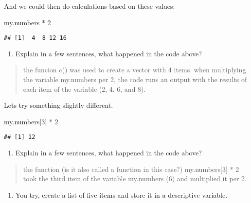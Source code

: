 \documentclass[
]{article}
\newenvironment{Shaded}{\begin{snugshade}}{\end{snugshade}}
\newcommand{\DecValTok}[1]{\textcolor[rgb]{0.00,0.00,0.81}{#1}}
\newcommand{\NormalTok}[1]{#1}
\newcommand{\SpecialCharTok}[1]{\textcolor[rgb]{0.00,0.00,0.00}{#1}}
\providecommand{\tightlist}{%
  \setlength{\itemsep}{0pt}\setlength{\parskip}{0pt}}
\begin{document}
And we could then do calculations based on these values:

\begin{Shaded}
\begin{Highlighting}[]
\NormalTok{my.numbers }\SpecialCharTok{*} \DecValTok{2}
\end{Highlighting}
\end{Shaded}

\begin{verbatim}
## [1]  4  8 12 16
\end{verbatim}

\begin{enumerate}
\def\labelenumi{(\arabic{enumi})}
\setcounter{enumi}{14}
\tightlist
\item
  Explain in a few sentences, what happened in the code above?
\end{enumerate}

\begin{quote}
the funcion c() was used to create a vector with 4 items. when
multiplying the variable my.numbers per 2, the code runs an output with
the results of each item of the variable (2, 4, 6, and 8).
\end{quote}

Lets try something slightly different.

\begin{Shaded}
\begin{Highlighting}[]
\NormalTok{my.numbers[}\DecValTok{3}\NormalTok{] }\SpecialCharTok{*} \DecValTok{2}
\end{Highlighting}
\end{Shaded}

\begin{verbatim}
## [1] 12
\end{verbatim}

\begin{enumerate}
\def\labelenumi{(\arabic{enumi})}
\setcounter{enumi}{15}
\tightlist
\item
  Explain in a few sentences, what happened in the code above?
\end{enumerate}

\begin{quote}
the function (is it also called a function in this case?)
my.numbers{[}3{]} * 2 took the third item of the variable my.numbers (6)
and multiplied it per 2.
\end{quote}

\begin{enumerate}
\def\labelenumi{(\arabic{enumi})}
\setcounter{enumi}{16}
\tightlist
\item
  You try, create a list of five items and store it in a descriptive
  variable.
\end{enumerate}
\end{document}

